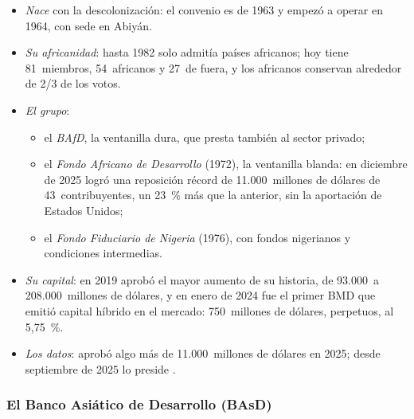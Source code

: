 \documentclass[11pt]{article}
\begin{document}
\begin{itemize}
\item \emph{Nace} con la descolonización: el convenio es de 1963 y empezó a operar en 1964, con sede en Abiyán.
\item \emph{Su africanidad}: hasta 1982 solo admitía países africanos; hoy tiene 81~miembros, 54~africanos y 27~de fuera, y los africanos conservan alrededor de 2/3 de los votos.
\item \emph{El grupo}:
  \begin{itemize}
  \item el \emph{BAfD}, la ventanilla dura, que presta también al sector privado;
  \item el \emph{Fondo Africano de Desarrollo} (1972), la ventanilla blanda: en diciembre de 2025 logró una reposición récord de 11.000~millones de dólares de 43~contribuyentes, un 23~\% más que la anterior, sin la aportación de Estados Unidos\nocite{BAfD2025FAD17};
  \item el \emph{Fondo Fiduciario de Nigeria} (1976), con fondos nigerianos y condiciones intermedias.
  \end{itemize}
\item \emph{Su capital}: en 2019 aprobó el mayor aumento de su historia, de 93.000~a 208.000~millones de dólares, y en enero de 2024 fue el primer BMD que emitió capital híbrido en el mercado: 750~millones de dólares, perpetuos, al 5,75~\%\nocite{BAfD2024Hibrido}.
\item \emph{Los datos}: aprobó algo más de 11.000~millones de dólares en 2025\nocite{BAfD2026Informe}; desde septiembre de 2025 lo preside .
\end{itemize}

\subsubsection{El Banco Asiático de Desarrollo (BAsD)}\label{sec:basd}
\end{document}
